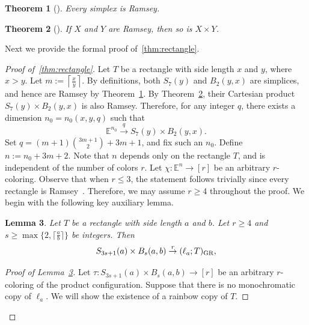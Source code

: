 \documentclass[11pt]{article}
\newtheorem{theorem}{Theorem}[section]
\newtheorem{lemma}[theorem]{Lemma}
\theoremstyle{definition}
\newcommand{\ceil}[1]{\lceil #1\rceil}
\begin{document}
\begin{theorem}[\cite{1990JAMS}]\label{thm:RodlFrankl}
Every simplex is Ramsey.
\end{theorem}

\begin{theorem}[\cite{1973JCTA}]\label{EGM}
If \(X\) and \(Y\) are Ramsey, then so is \(X \times Y\).
\end{theorem}


Next we provide the formal proof of~\cref{thm:rectangle}.

\begin{proof}[Proof of~\cref{thm:rectangle}]
Let \(T\) be a rectangle with side length \(x\) and \(y\), where \(x> y\). Let \(m := \left\lceil \frac{x}{y} \right\rceil\). By definitions, both \(S_7(y)\) and \(B_2(y, x)\) are simplices, and hence are Ramsey by Theorem~\ref{thm:RodlFrankl}. By Theorem~\ref{EGM}, their Cartesian product \(S_7(y) \times B_2(y, x)\) is also Ramsey. Therefore, for any integer \(q\), there exists a dimension \(n_0 = n_0(x, y, q)\) such that
\[
\mathbb{E}^{n_0} \overset{q}{\rightarrow} S_7(y) \times B_2(y, x).
\]
Set \(q = (m+1)\binom{3m+1}{2} + 3m + 1\), and fix such an \(n_0\). Define \(n := n_0 + 3m + 2\). Note that \(n\) depends only on the rectangle \(T\), and is independent of the number of colors \(r\). Let \(\chi \colon \mathbb{E}^{n} \to [r]\) be an arbitrary \(r\)-coloring. Observe that when \(r \le 3\), the statement follows trivially since every rectangle is Ramsey~\cite{1973JCTA}. Therefore, we may assume \(r \ge 4\) throughout the proof. We begin with the following key auxiliary lemma.

\begin{lemma}\label{lemma:aux1}
Let \(T\) be a rectangle with side length \(a\) and \(b\). Let \( r \ge 4 \) and \(s\ge \max \{2,\ceil{\frac{a}{b}}\}\) be integers. Then
\[
S_{3s+1}(a) \times B_{s}(a, b) \overset{r}{\rightarrow} (\ell_{a}; T)_{\textup{GR}},
\]
\end{lemma}
\begin{proof}[Proof of Lemma~\ref{lemma:aux1}]
Let \( \tau \colon S_{3s+1}(a) \times B_s(a, b) \to [r] \) be an arbitrary \(r\)-coloring of the product configuration. Suppose that there is no monochromatic copy of \(\ell_a\). We will show the existence of a rainbow copy of \(T\).


\end{proof}
\end{proof}
\end{document}
